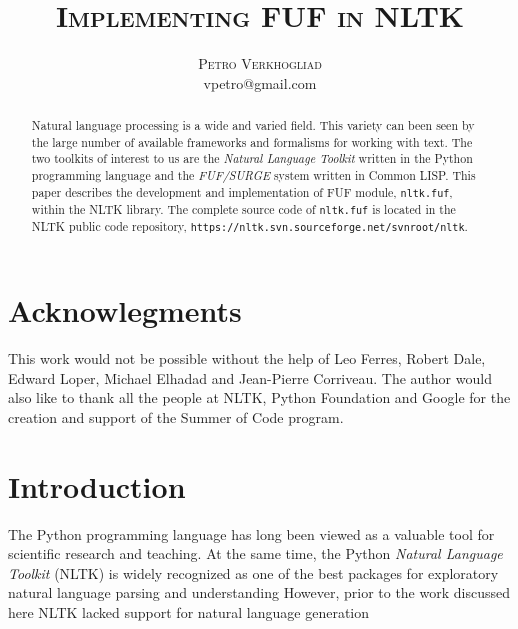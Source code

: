 \documentclass[12pt]{article}
\begin{document}
    

\thispagestyle{empty}
\title{\textsc{\Huge Implementing FUF in NLTK}}
\author{\textsc{Petro Verkhogliad } 
   \\ vpetro@gmail.com
    }
\thispagestyle{empty}

\date{ }
\maketitle

\pagebreak
\thispagestyle{empty}
\begin{abstract}
Natural language processing is a wide and varied field. This variety can been seen by the 
large number of available frameworks and formalisms for working with text. The two 
toolkits of interest to us are the \textit{Natural Language Toolkit}
written in the Python programming language and the \textit{FUF/SURGE}
system written in Common LISP. This paper describes the development and implementation of FUF module, \texttt{nltk.fuf},
within the NLTK library. The complete source code of \texttt{nltk.fuf} is located in the NLTK public code repository, 
{\footnotesize \texttt{https://nltk.svn.sourceforge.net/svnroot/nltk}}.
\end{abstract}
\thispagestyle{empty}
\pagebreak
\tableofcontents
\pagebreak
\thispagestyle{empty}
\listoffigures
\pagebreak

\section*{Acknowlegments}
This work would not be possible without the help of Leo Ferres, Robert Dale, Edward Loper, Michael Elhadad and Jean-Pierre Corriveau. 
The author would also like to thank all the people at NLTK, Python Foundation and Google 
for the creation and support of the Summer of Code program.
\pagebreak

\section{Introduction}
The Python programming language has long been viewed as a valuable tool for scientific research and teaching.
At the same time, the Python \textit{Natural Language Toolkit} (NLTK) is widely recognized as one of the best
packages for exploratory natural language parsing and understanding 
However, prior to the work discussed here NLTK lacked support for natural language generation 
\end{document}
